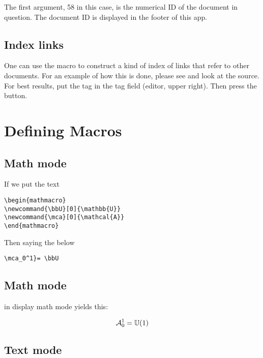 The first argument, 58 in this case, is the numerical ID of the document in question. The document ID is displayed in the footer of this app.

\subsection{Index links}

One can use the  macro to construct a kind of index of links that refer to other documents.  For an example of how this is done, please see  and look at the source. For best results, put the tag  in the tag field (editor, upper right).  Then press the  button.

\section{Defining Macros}

\subsection{Math mode}

If we put the text

\begin{verbatim}
\begin{mathmacro}
\newcommand{\bbU}[0]{\mathbb{U}}
\newcommand{\mca}[0]{\mathcal{A}}
\end{mathmacro}
\end{verbatim}


\begin{mathmacro}
\newcommand{\bbU}[0]{\mathbb{U}}
\newcommand{\mca}[0]{\mathcal{A}}
\end{mathmacro}

Then saying the below

\begin{verbatim}
\mca_0^1}= \bbU
\end{verbatim}

\subsection{Math mode}

in display math mode yields this:

$$
\mca_0^1 = \bbU(1)
$$


\subsection{Text mode}

